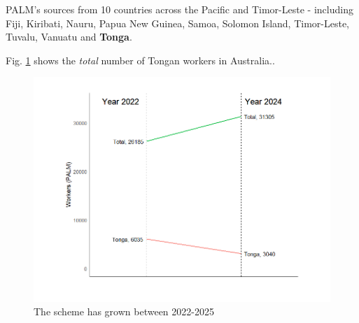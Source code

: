 \documentclass[9pt,a4paper,twocolumn,twoside]{tau-class/tau}
\begin{document}
PALM's sources from 10 countries across the Pacific and Timor-Leste - including Fiji, Kiribati, Nauru, Papua New Guinea, Samoa, Solomon Island, Timor-Leste, Tuvalu, Vanuatu and \textbf{Tonga}. 
		
    	Fig. \ref{fig:TotalPALM} shows the \textit{total} number of Tongan workers in Australia..
    		
    	\begin{figure}[H]
    		\centering
    		\includegraphics[width=.9\columnwidth]{figures/TongaPALM.png}
    		\caption{The scheme has grown between 2022-2025}
    		\label{fig:TotalPALM}
    	\end{figure}
		
		
\end{document}

